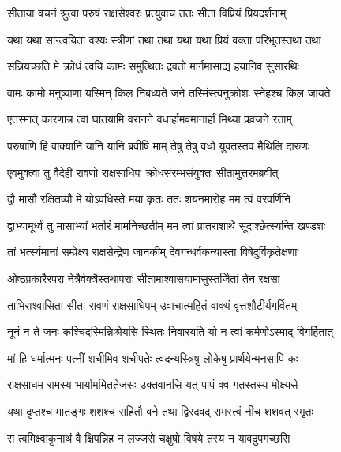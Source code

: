 
\twolineshloka
{सीताया वचनं श्रुत्वा परुषं राक्षसेश्वरः}
{प्रत्युवाच ततः सीतां विप्रियं प्रियदर्शनाम्} %

\twolineshloka
{यथा यथा सान्त्वयिता वश्यः स्त्रीणां तथा तथा}
{यथा यथा प्रियं वक्ता परिभूतस्तथा तथा} %

\twolineshloka
{सन्नियच्छति मे क्रोधं त्वयि कामः समुत्थितः}
{द्रवतो मार्गमासाद्य हयानिव सुसारथिः} %

\twolineshloka
{वामः कामो मनुष्याणां यस्मिन् किल निबध्यते}
{जने तस्मिंस्त्वनुक्रोशः स्नेहश्च किल जायते} %

\twolineshloka
{एतस्मात् कारणान्न त्वां घातयामि वरानने}
{वधार्हामवमानार्हां मिथ्या प्रव्रजने रताम्} %

\twolineshloka
{परुषाणि हि वाक्यानि यानि यानि ब्रवीषि माम्}
{तेषु तेषु वधो युक्तस्तव मैथिलि दारुणः} %

\twolineshloka
{एवमुक्त्वा तु वैदेहीं रावणो राक्षसाधिपः}
{क्रोधसंरम्भसंयुक्तः सीतामुत्तरमब्रवीत्} %

\twolineshloka
{द्वौ मासौ रक्षितव्यौ मे योऽवधिस्ते मया कृतः}
{ततः शयनमारोह मम त्वं वरवर्णिनि} %

\twolineshloka
{द्वाभ्यामूर्ध्वं तु मासाभ्यां भर्तारं मामनिच्छतीम्}
{मम त्वां प्रातराशार्थे सूदाश्छेत्स्यन्ति खण्डशः} %

\twolineshloka
{तां भर्त्स्यमानां सम्प्रेक्ष्य राक्षसेन्द्रेण जानकीम्}
{देवगन्धर्वकन्यास्ता विषेदुर्विकृतेक्षणाः} %

\twolineshloka
{ओष्ठप्रकारैरपरा नेत्रैर्वक्त्रैस्तथापराः}
{सीतामाश्वासयामासुस्तर्जितां तेन रक्षसा} %

\twolineshloka
{ताभिराश्वासिता सीता रावणं राक्षसाधिपम्}
{उवाचात्महितं वाक्यं वृत्तशौटीर्यगर्वितम्} %

\twolineshloka
{नूनं न ते जनः कश्चिदस्मिन्निःश्रेयसि स्थितः}
{निवारयति यो न त्वां कर्मणोऽस्माद् विगर्हितात्} %

\twolineshloka
{मां हि धर्मात्मनः पत्नीं शचीमिव शचीपतेः}
{त्वदन्यस्त्रिषु लोकेषु प्रार्थयेन्मनसापि कः} %

\twolineshloka
{राक्षसाधम रामस्य भार्याममिततेजसः}
{उक्तवानसि यत् पापं क्व गतस्तस्य मोक्ष्यसे} %

\twolineshloka
{यथा दृप्तश्च मातङ्गः शशश्च सहितौ वने}
{तथा द्विरदवद् रामस्त्वं नीच शशवत् स्मृतः} %

\twolineshloka
{स त्वमिक्ष्वाकुनाथं वै क्षिपन्निह न लज्जसे}
{चक्षुषो विषये तस्य न यावदुपगच्छसि} %

